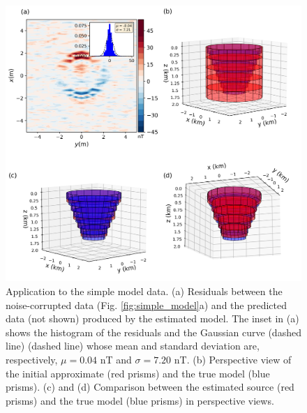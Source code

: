 \begin{figure}
	\centering
	\includegraphics[scale=.5]{figures/simple_results.png}
	\caption{Application to the simple model data. (a) Residuals between the  noise-corrupted data (Fig. \ref{fig:simple_model}a) and the predicted data (not shown) produced by the estimated model. The inset in (a) shows the histogram of the residuals and the Gaussian curve (dashed line) (dashed line) whose mean and standard deviation are, respectively, $\mu = 0.04$ nT and $\sigma=7.20$ nT. (b) Perspective view of the initial approximate (red prisms) and the true model (blue prisms). (c) and (d) Comparison between the estimated source (red prisms) and the true model (blue prisms) in perspective views.}
	\label{fig:simple_results}
\end{figure}


